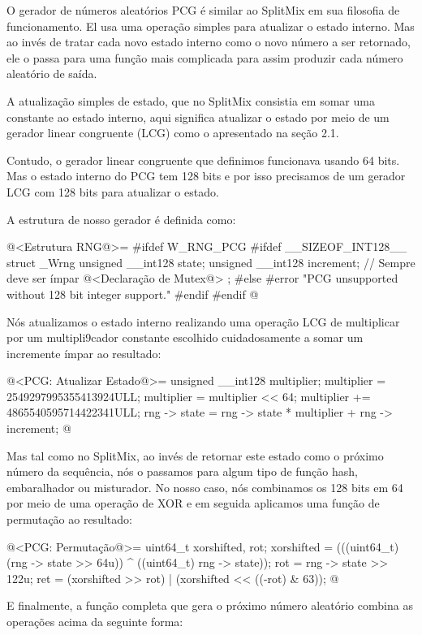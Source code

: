 O gerador de números aleatórios PCG é similar ao SplitMix em sua
filosofia de funcionamento. El usa uma operação simples para atualizar
o estado interno. Mas ao invés de tratar cada novo estado interno como
o novo número a ser retornado, ele o passa para uma função mais
complicada para assim produzir cada número aleatório de saída.

A atualização simples de estado, que no SplitMix consistia em somar
uma constante ao estado interno, aqui significa atualizar o estado por
meio de um gerador linear congruente (LCG) como o apresentado na seção
2.1.

Contudo, o gerador linear congruente que definimos funcionava usando
64 bits. Mas o estado interno do PCG tem 128 bits e por isso
precisamos de um gerador LCG com 128 bits para atualizar o estado.

A estrutura de nosso gerador é definida como:

\iniciocodigo
@<Estrutura RNG@>=
#ifdef W_RNG_PCG
#ifdef __SIZEOF_INT128__
struct _Wrng{
  unsigned __int128 state;
  unsigned __int128 increment; // Sempre deve ser ímpar
  @<Declaração de Mutex@>
};
#else
#error "PCG unsupported without 128 bit integer support."
#endif
#endif
@
\fimcodigo

Nós atualizamos o estado interno realizando uma operação LCG de
multiplicar por um multipli9cador constante escolhido cuidadosamente a
somar um incremente ímpar ao resultado:

\iniciocodigo
@<PCG: Atualizar Estado@>=
{
  unsigned __int128 multiplier;
  multiplier = 2549297995355413924ULL;
  multiplier = multiplier << 64;
  multiplier += 4865540595714422341ULL;
  rng -> state = rng -> state * multiplier + rng -> increment;
}
@
\fimcodigo

Mas tal como no SplitMix, ao invés de retornar este estado como o
próximo número da sequência, nós o passamos para algum tipo de função
hash, embaralhador ou misturador. No nosso caso, nós combinamos os 128
bits em 64 por meio de uma operação de XOR e em seguida aplicamos uma
função de permutação ao resultado:

\iniciocodigo
@<PCG: Permutação@>=
{
  uint64_t xorshifted, rot;
  xorshifted = (((uint64_t)(rng -> state >> 64u)) ^ ((uint64_t) rng -> state));
  rot = rng -> state >> 122u;
  ret = (xorshifted >> rot) | (xorshifted << ((-rot) & 63));
}
@
\fimcodigo

E finalmente, a função completa que gera o próximo número aleatório
combina as operações acima da seguinte forma:

